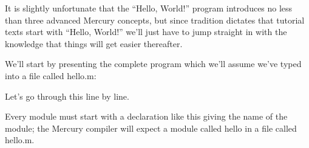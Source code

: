 \documentclass[a4paper,11pt,notitlepage,onecolumn]{book}
\begin{document}
It is slightly unfortunate that the ``Hello, World!'' program introduces
no less than three advanced Mercury concepts, but since tradition
dictates that tutorial texts start with ``Hello, World!'' we'll just
have to jump straight in with the knowledge that things will get easier
thereafter.

We'll start by presenting the complete program which we'll assume we've
typed into a file called \textsf{hello.m}:
\begin{small}

\begin{ptabular}
\nextline
{}
\nextline
{}
\nextline
{}
\nextline
{}
\nextline
{}
\nextline
{}
\nextline
\end{ptabular}

\end{small}
Let's go through this line by line.
\begin{small}

\begin{ptabular}
\nextline
\end{ptabular}

\end{small}
Every module must start with a declaration like this giving the name of the
module; the Mercury compiler will expect a module called \textsf{hello} in
a file called \textsf{hello.m}.
\begin{small}

\begin{ptabular}
\nextline
\end{ptabular}

\end{small}
\end{document}
